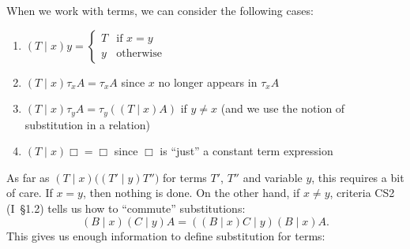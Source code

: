 \documentclass{amsart}
\begin{document}
When we work with terms, we can consider the following cases:
\begin{enumerate}
\item $\displaystyle{(T\mid x)y=\begin{cases}T &\mbox{if }x=y\\y &\mbox{otherwise}\end{cases}}$
\item $(T\mid x)\tau_{x}A=\tau_{x}A$ since $x$ no longer appears in $\tau_{x}A$
\item $(T\mid x)\tau_{y}A=\tau_{y}((T\mid x)A)$ if $y\neq x$ (and we use
  the notion of substitution in a relation)
\item $(T\mid x)\Box = \Box$ since $\Box$ is ``just'' a constant term expression
\end{enumerate}
As far as $(T\mid x)\bigl((T'\mid y)T''\bigr)$ for terms $T'$, $T''$ and
variable $y$, this requires a bit of care. If $x=y$, then nothing is
done. On the other hand, if $x\neq y$, criteria CS2 (I~\S1.2) tells us
how to ``commute'' substitutions:
\begin{equation}
(B\mid x)(C\mid y)A=((B\mid x)C\mid y)(B\mid x)A.
\end{equation}
This gives us enough information to define substitution for terms:
\end{document}

